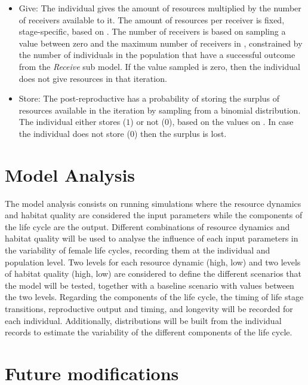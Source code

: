 \documentclass{article}
\begin{document}
\begin{itemize}
\begin{itemize}
        \item Give: The individual gives the amount of resources multiplied by the number of receivers available to it. The amount of resources per receiver is fixed, stage-specific, based on \cite{gurven2004give}. The number of receivers is based on sampling a value between zero and the maximum number of receivers in \cite{gurven2004give}, constrained by the number of individuals in the population that have a successful outcome from the \emph{Receive} sub model. If the value sampled is zero, then the individual does not give resources in that iteration.
        \item Store: The post-reproductive has a probability of storing the surplus of resources available in the iteration by sampling from a binomial distribution. The individual either stores ($1$) or not ($0$), based on the values on \citep{bowles2011cultivation}. In case the individual does not store ($0$) then the surplus is lost.
    \end{itemize}
\end{itemize}

\section{Model Analysis}

The model analysis consists on running simulations where the resource dynamics and habitat quality are considered the input parameters while the components of the life cycle are the output. Different combinations of resource dynamics and habitat quality will be used to analyse the influence of each input parameters in the variability of female life cycles, recording them at the individual and population level. Two levels for each resource dynamic (high, low) and two levels of habitat quality (high, low) are considered to define the different scenarios that the model will be tested, together with a baseline scenario with values between the two levels. Regarding the components of the life cycle, the timing of life stage transitions, reproductive output and timing, and longevity will be recorded for each individual. Additionally, distributions will be built from the individual records to estimate the variability of the different components of the life cycle.

\section{Future modifications}
\end{document}
